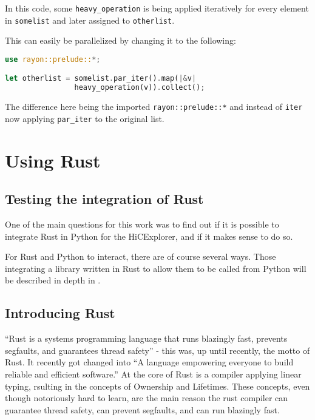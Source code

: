 In this code, some \verb|heavy_operation| is being applied iteratively for every element in \verb|somelist| and later assigned to \verb|otherlist|.

This can easily be parallelized by changing it to the following:

\vline
\begin{lstlisting}[language=Rust]
use rayon::prelude::*;

let otherlist = somelist.par_iter().map(|&v|
                heavy_operation(v)).collect();
\end{lstlisting}
\vline

The difference here being the imported \verb|rayon::prelude::*| and instead of
\verb|iter| now applying \verb|par_iter| to the original list.





\newpage
\section{Using Rust}\label{sec:rust}


\subsection{Testing the integration of Rust}


One of the main questions for this work was to find out if it is possible to
integrate Rust in Python for the HiCExplorer, and if it makes sense to do so.

For Rust and Python to interact, there are of course several ways. Those
integrating a library written in Rust to allow them to be called from Python
will be described in depth in .


\subsection{Introducing Rust}

``Rust is a systems programming language that runs blazingly fast, prevents
segfaults, and guarantees thread safety'' - this was, up until recently, the
motto of Rust. It recently got changed into ``A language empowering everyone 
to build reliable and efficient software.'' At the core of Rust is a compiler
applying linear typing, rsulting in the concepts of Ownership and Lifetimes.
These concepts, even though notoriously hard to learn, are the main reason the
rust compiler can guarantee thread safety, can prevent segfaults, and can run
blazingly fast.

